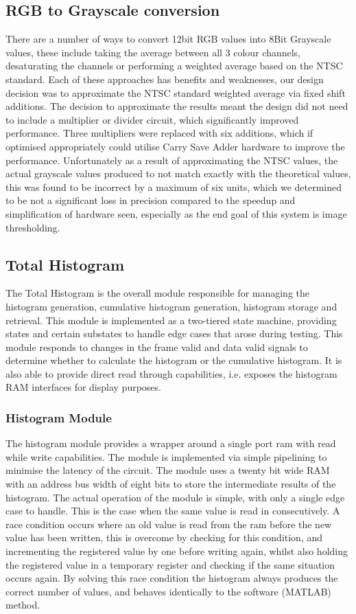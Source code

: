 \documentclass[12pt]{article}
\begin{document}
  \subsection{RGB to Grayscale conversion}
  There are a number of ways to convert 12bit RGB values into 8Bit Grayscale values, these include taking the average between all 3 colour channels, desaturating the channels or performing a weighted average based on the NTSC standard. Each of these approaches has benefits and weaknesses, our design decision was to approximate the NTSC standard weighted average via fixed shift additions. The decision to approximate the results meant the design did not need to include a multiplier or divider circuit, which significantly improved performance. Three multipliers were replaced with six additions, which if optimised appropriately could utilise Carry Save Adder hardware to improve the performance. Unfortunately as a result of approximating the NTSC values, the actual grayscale values produced to not match exactly with the theoretical values, this was found to be incorrect by a maximum of six units, which we determined to be not a significant loss in precision compared to the speedup and simplification of hardware seen, especially as the end goal of this system is image thresholding.

  \subsection{Total Histogram}
  The Total Histogram is the overall module responsible for managing the histogram generation, cumulative histogram generation, histogram storage and retrieval. This module is implemented as a two-tiered state machine, providing states and certain substates to handle edge cases that arose during testing. This module responds to changes in the frame valid and data valid signals to determine whether to calculate the histogram or the cumulative histogram. It is also able to provide direct read through capabilities, i.e. exposes the histogram RAM interfaces for display purposes.

  \subsubsection{Histogram Module}
  The histogram module provides a wrapper around a single port ram with read while write capabilities. The module is implemented via simple pipelining to minimise the latency of the circuit. The module uses a twenty bit wide RAM with an address bus width of eight bits to store the intermediate results of the histogram. The actual operation of the module is simple, with only a single edge case to handle. This is the case when the same value is read in consecutively. A race condition occurs where an old value is read from the ram before the new value has been written, this is overcome by checking for this condition, and incrementing the registered value by one before writing again, whilst also holding the registered value in a temporary register and checking if the same situation occurs again. By solving this race condition the histogram always produces the correct number of values, and behaves identically to the software (MATLAB) method.\\
\end{document}
